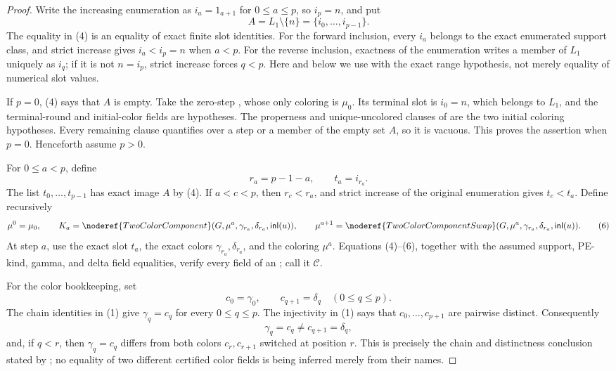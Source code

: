 \begin{proof}
Write the increasing enumeration as
\(i_a=1_{a+1}\) for \(0\leq a\leq p\), so \(i_p=n\), and put
\[
 A=L_1\setminus\{n\}=\{i_0,\ldots,i_{p-1}\}.                \tag{4}
\]
The equality in (4) is an equality of exact finite slot identities.  For
the forward inclusion, every \(i_a\) belongs to the exact enumerated
support class, and strict increase gives \(i_a<i_p=n\) when \(a<p\).
For the reverse inclusion, exactness of the enumeration writes a member
of \(L_1\) uniquely as \(i_q\); if it is not \(n=i_p\), strict increase
forces \(q<p\).  Here and below we use
 with the exact range hypothesis, not
merely equality of numerical slot values.

If \(p=0\), (4) says that \(A\) is empty.  Take the zero-step
, whose only coloring is
\(\mu_0\).  Its terminal slot is \(i_0=n\), which belongs to \(L_1\),
and the terminal-round and initial-color fields are hypotheses.  The
properness and unique-uncolored clauses of
 are the two initial coloring
hypotheses.  Every remaining clause quantifies over a step or a member of
the empty set \(A\), so it is vacuous.  This proves the assertion when
\(p=0\).  Henceforth assume \(p>0\).

For \(0\leq a<p\), define
\[
 r_a=p-1-a,\qquad t_a=i_{r_a}.                                \tag{5}
\]
The list \(t_0,\ldots,t_{p-1}\) has exact image \(A\) by (4).  If
\(a<c<p\), then \(r_c<r_a\), and strict increase of the original
enumeration gives \(t_c<t_a\).  Define recursively
\[
 \mu^0=\mu_0,\qquad
 K_a=\noderef{TwoColorComponent}
   (G,\mu^a,\gamma_{r_a},\delta_{r_a},\mathsf{inl}(u)),
 \qquad
 \mu^{a+1}=\noderef{TwoColorComponentSwap}
   (G,\mu^a,\gamma_{r_a},\delta_{r_a},\mathsf{inl}(u)).       \tag{6}
\]
At step \(a\), use the exact slot \(t_a\), the exact colors
\(\gamma_{r_a},\delta_{r_a}\), and the coloring \(\mu^a\).  Equations
(4)--(6), together with the assumed support, PE-kind, gamma, and delta
field equalities, verify every field of an
; call it \(\mathcal C\).

For the color bookkeeping, set
\[
 c_0=\gamma_0,\qquad c_{q+1}=\delta_q\quad(0\leq q\leq p).   \tag{7}
\]
The chain identities in (1) give \(\gamma_q=c_q\) for every
\(0\leq q\leq p\).  The injectivity in (1) says that
\(c_0,\ldots,c_{p+1}\) are pairwise distinct.  Consequently
\[
 \gamma_q=c_q\ne c_{q+1}=\delta_q,                           \tag{8}
\]
and, if \(q<r\), then \(\gamma_q=c_q\) differs from both colors
\(c_r,c_{r+1}\) switched at position \(r\).  This is precisely the
chain and distinctness conclusion stated by
; no equality of two different
certified color fields is being inferred merely from their names.


\end{proof}
